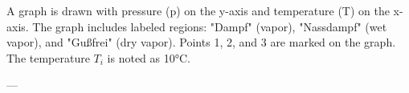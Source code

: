 A graph is drawn with pressure (p) on the y-axis and temperature (T) on the x-axis. The graph includes labeled regions: "Dampf" (vapor), "Nassdampf" (wet vapor), and "Gußfrei" (dry vapor). Points 1, 2, and 3 are marked on the graph. The temperature \( T_i \) is noted as 10°C.

---